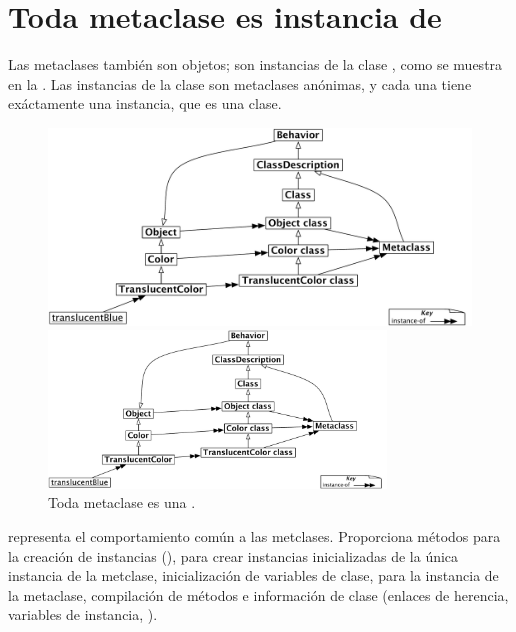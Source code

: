 \documentclass[a4paper,10pt,twoside]{book}
\begin{document}
\section{Toda metaclase es instancia de }

Las metaclases tambi\'en son objetos; son instancias de la clase , como se muestra en la . Las instancias
de la clase  son metaclases an\'onimas, y cada una tiene ex\'actamente una instancia, que es una clase.

\begin{center}
\begin{figure}
\ifluluelse
	{\centerline{\includegraphics[width=\textwidth]{TranslucentMetaclassClass}}}
	{\centerline{\includegraphics[width=0.8\textwidth]{TranslucentMetaclassClass}}}
\caption{Toda metaclase es una .}
\end{figure}
\end{center}

 representa el comportamiento com\'un a las metclases. Proporciona m\'etodos para la creaci\'on de instancias  (), para crear instancias inicializadas de la \'unica instancia de la metclase, inicializaci\'on de variables de clase, para la instancia de la metaclase, compilaci\'on de m\'etodos e informaci\'on de clase (enlaces de herencia, variables de instancia, \etc).
\end{document}
